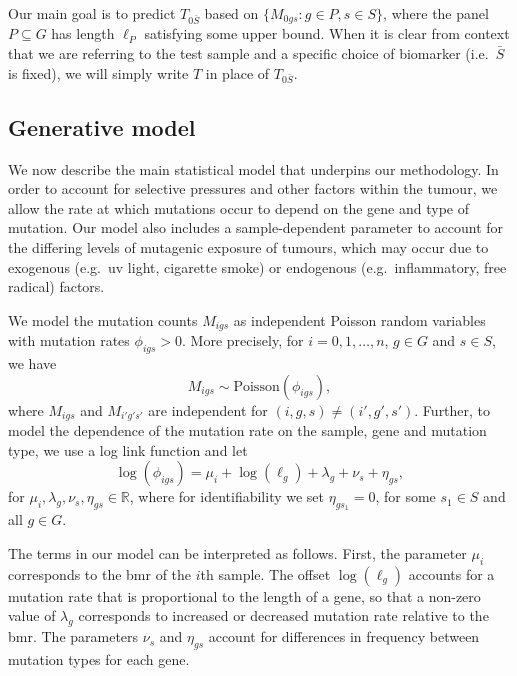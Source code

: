 \documentclass[../thesis.tex]{subfiles}
\begin{document}
Our main goal is to predict $T_{0\bar{S}}$ based on $\{M_{0gs}: g \in P, s \in S\}$, where the panel $P \subseteq G$ has length $\ell_P$ satisfying some upper bound. When it is clear from context that we are referring to the test sample and a specific choice of biomarker (i.e.~$\bar{S}$ is fixed), we will simply write $T$ in place of $T_{0\bar{S}}$. 

\subsection{Generative model \label{sec:genmodel}}
We now describe the main statistical model that underpins our methodology. In order to account for selective pressures and other factors within the tumour, we allow the rate at which mutations occur to depend on the gene and type of mutation. Our model also includes a sample-dependent parameter to account for the differing levels of mutagenic exposure of tumours, which may occur due to exogenous (e.g.~\gls{uv} light, cigarette smoke) or endogenous (e.g.~inflammatory, free radical) factors.  

We model the mutation counts $M_{igs}$ as independent Poisson random variables with mutation rates $\phi_{igs} > 0$. More precisely, for $i = 0, 1, \ldots, n$, $g \in G$ and $s \in S$, we have
\begin{equation}
    \label{eq:Poisson}
M_{igs} \sim \mathrm{Poisson}(\phi_{igs}),
\end{equation}
where $M_{igs}$ and $M_{i'g's'}$ are independent for $(i,g,s) \neq (i',g',s')$.  Further, to model the dependence of the mutation rate on the sample, gene and mutation type, we use a log link function and let 
\begin{equation}
    \label{eq:loglink}
\log(\phi_{igs}) =  \mu_i + \log(\ell_g) + \lambda_g + \nu_s + \eta_{gs},
\end{equation} 
for $\mu_i, \lambda_{g},\nu_{s},\eta_{gs} \in \mathbb{R}$, where for identifiability we set $\eta_{gs_1} = 0$, for  some $s_1 \in S$ and all $g \in G$. 

The terms in our model can be interpreted as follows. First, the parameter $\mu_i$ corresponds to the \gls{bmr} of the $i$th sample. The offset $\log(\ell_g)$ accounts for a mutation rate that is proportional to the length of a gene, so that a non-zero value of $\lambda_g$ corresponds to increased or decreased mutation rate relative to the \gls{bmr}.  The parameters $\nu_s$ and $\eta_{gs}$ account for differences in frequency between mutation types for each gene. 
\end{document}
